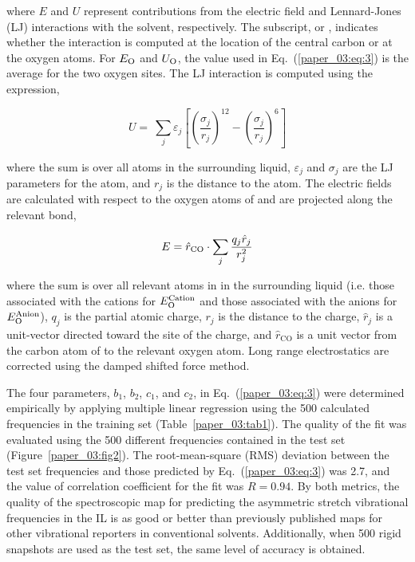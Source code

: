 where \(E\) and \(U\) represent contributions from the electric field and Lennard-Jones (LJ) interactions with the solvent, respectively. The subscript,  or , indicates whether the interaction is computed at the location of the  central carbon or at the oxygen atoms. For \(E_{\ce{O}}\) and \(U_{\ce{O}}\), the value used in Eq.~(\ref{paper_03:eq:3}) is the average for the two  oxygen sites. The LJ interaction is computed using the expression,

\begin{equation}
  \label{paper_03:eq:4}
  U = \ \sum_{j}^{}\varepsilon_{j}\left\lbrack \left( \frac{\sigma_{j}}{r_{j}} \right)^{12} - \left( \frac{\sigma_{j}}{r_{j}} \right)^{6} \right\rbrack
\end{equation}

where the sum is over all atoms in the surrounding liquid, \(\varepsilon_{j}\) and \(\sigma_{j}\) are the LJ parameters for the atom, and \(r_{j}\) is the distance to the atom. The electric fields are calculated with respect to the oxygen atoms of  and are projected along the relevant  bond,

\begin{equation}
  \label{paper_03:eq:5}
  E = {\hat{r}}_{\ce{CO}} \cdot \sum_{j}^{}\frac{q_{j}{\hat{r}}_{j}}{r_{j}^{2}}
\end{equation}

where the sum is over all relevant atoms in in the surrounding liquid (i.e. those associated with the cations for \(E_{\ce{O}}^{\text{Cation}}\) and those associated with the anions for \(E_{\ce{O}}^{\text{Anion}}\)), \(q_{j}\) is the partial atomic charge, \(r_{j}\) is the distance to the charge, \({\hat{r}}_{j}\) is a unit-vector directed toward the site of the charge, and \({\hat{r}}_{\mathrm{\text{CO}}}\) is a unit vector from the carbon atom of  to the relevant oxygen atom. Long range electrostatics are corrected using the damped shifted force method.\cite{86}

The four parameters, \(b_{1}\), \(b_{2}\), \(c_{1}\), and \(c_{2}\), in Eq.~(\ref{paper_03:eq:3}) were determined empirically by applying multiple linear regression using the \num{500} calculated frequencies in the training set (Table~\ref{paper_03:tab1}). The quality of the fit was evaluated using the \num{500} different frequencies contained in the test set (Figure~\ref{paper_03:fig2}). The root-mean-square (RMS) deviation between the test set frequencies and those predicted by Eq.~(\ref{paper_03:eq:3}) was \SI{2.7}{\wavenumber}, and the value of correlation coefficient for the fit was \(R = 0.94\). By both metrics, the quality of the spectroscopic map for predicting the  asymmetric stretch vibrational frequencies in the \ce{[C4C1im][PF6]} IL is as good or better than previously published maps for other vibrational reporters in conventional solvents. Additionally, when \num{500} rigid  snapshots are used as the test set, the same level of accuracy is obtained.


